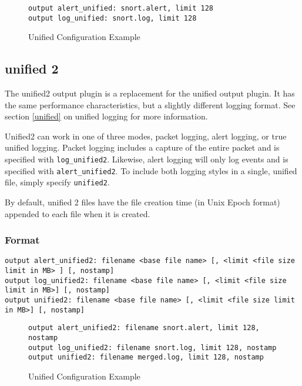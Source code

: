 \documentclass[english]{report}
\newenvironment{note}{
\samepage
    \vspace{10pt}{\textsf{
        {\hspace{7pt}\Huge{$\triangle$\hspace{-12.5pt}{\Large{$^!$}}}}\hspace{5pt}
        {\Large{NOTE}}
    }
    }
   \begin{center}
    \par\vspace{-17pt}

    \begin{lrbox}{\savepar}
    \begin{minipage}[r]{6in}
}
{
    \end{minipage}
    \end{lrbox}
    \fbox{
        \usebox{
            \savepar
	}
    }
    \par\vskip10pt
    \end{center}
}
\newenvironment{note}{
        \begin{rawhtml}
        <p><table border="1"><tr><td><b>
        Note:&nbsp;&nbsp;</b>
        \end{rawhtml}
}{
        \begin{rawhtml}
        </b></td></tr></table></p>
        \end{rawhtml}
}
\begin{document}
\begin{figure}[!hbpt]
\begin{verbatim}
output alert_unified: snort.alert, limit 128
output log_unified: snort.log, limit 128
\end{verbatim}
\caption{Unified Configuration Example\label{unified example}}
\end{figure}

\subsection{unified 2}

The unified2 output plugin is a replacement for the unified output plugin.  It
has the same performance characteristics, but a slightly different logging 
format.  See section \ref{unified} on unified logging for more information.

Unified2 can work in one of three modes, packet logging, alert logging, or
true unified logging.  Packet logging includes a capture of the entire packet
and is specified with \texttt{log\_unified2}.  Likewise, alert logging will only
log events and is specified with \texttt{alert\_unified2}.  To include both 
logging styles in a single, unified file, simply specify \texttt{unified2}.


\begin{note}
By default, unified 2 files have the file creation time (in Unix Epoch format) 
appended to each file when it is created.  
\end{note}

\subsubsection{Format}

\begin{verbatim}
output alert_unified2: filename <base file name> [, <limit <file size limit in MB> ] [, nostamp]
output log_unified2: filename <base file name> [, <limit <file size limit in MB>] [, nostamp]
output unified2: filename <base file name> [, <limit <file size limit in MB>] [, nostamp]
\end{verbatim}


\begin{figure}[!hbpt]
\begin{verbatim}
output alert_unified2: filename snort.alert, limit 128, nostamp
output log_unified2: filename snort.log, limit 128, nostamp
output unified2: filename merged.log, limit 128, nostamp
\end{verbatim}
\caption{Unified Configuration Example\label{unified example}}
\end{figure}
\end{document}
